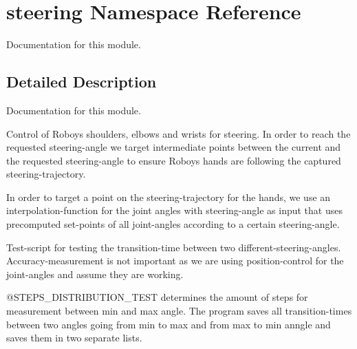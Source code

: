 \hypertarget{namespacesteering}{}\section{steering Namespace Reference}
\label{namespacesteering}


Documentation for this module.  




\subsection{Detailed Description}
Documentation for this module. 

Control of Roboys\textquotesingle{} shoulders, elbows and wrists for steering. In order to reach the requested steering-\/angle we target intermediate points between the current and the requested steering-\/angle to ensure Roboys\textquotesingle{} hands are following the captured steering-\/trajectory.

In order to target a point on the steering-\/trajectory for the hands, we use an interpolation-\/function for the joint angles with steering-\/angle as input that uses precomputed set-\/points of all joint-\/angles according to a certain steering-\/angle.

Test-\/script for testing the transition-\/time between two different-\/steering-\/angles. Accuracy-\/measurement is not important as we are using position-\/control for the joint-\/angles and assume they are working.

@\+S\+T\+E\+P\+S\+\_\+\+D\+I\+S\+T\+R\+I\+B\+U\+T\+I\+O\+N\+\_\+\+T\+E\+ST determines the amount of steps for measurement between min and max angle. The program saves all transition-\/times between two angles going from min to max and from max to min anngle and saves them in two separate lists. 